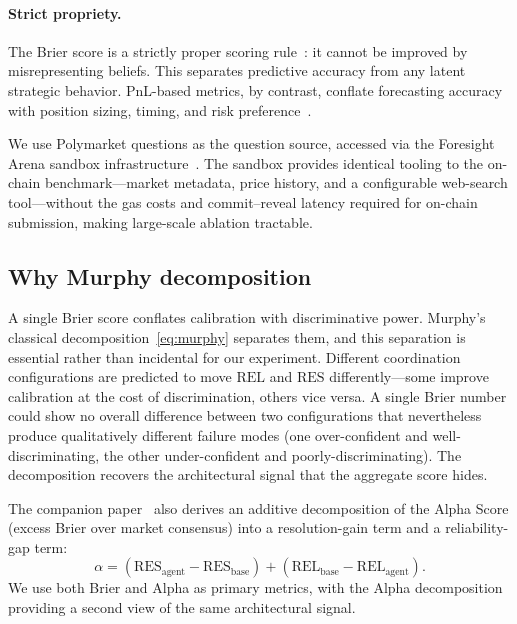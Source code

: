 \documentclass[11pt]{article}
\newcommand{\REL}{\mathrm{REL}}
\newcommand{\RES}{\mathrm{RES}}
\begin{document}
\paragraph{Strict propriety.}
The Brier score is a strictly proper scoring rule~\citep{brier1950verification,gneiting2007strictly}: it cannot be improved by misrepresenting beliefs. This separates predictive accuracy from any latent strategic behavior. PnL-based metrics, by contrast, conflate forecasting accuracy with position sizing, timing, and risk preference~\citep{nechepurenko2026foresight,zhang2026predictionarena}.

We use Polymarket questions as the question source, accessed via the Foresight Arena sandbox infrastructure~\citep{nechepurenko2026foresight}. The sandbox provides identical tooling to the on-chain benchmark---market metadata, price history, and a configurable web-search tool---without the gas costs and commit--reveal latency required for on-chain submission, making large-scale ablation tractable.

\subsection{Why Murphy decomposition}
\label{sec:method-murphy}

A single Brier score conflates calibration with discriminative power. Murphy's classical decomposition~\eqref{eq:murphy} separates them, and this separation is essential rather than incidental for our experiment. Different coordination configurations are predicted to move $\REL$ and $\RES$ differently---some improve calibration at the cost of discrimination, others vice versa. A single Brier number could show no overall difference between two configurations that nevertheless produce qualitatively different failure modes (one over-confident and well-discriminating, the other under-confident and poorly-discriminating). The decomposition recovers the architectural signal that the aggregate score hides.

The companion paper~\citep{nechepurenko2026foresight} also derives an additive decomposition of the Alpha Score (excess Brier over market consensus) into a resolution-gain term and a reliability-gap term:
\begin{equation*}
\alpha = (\RES_{\mathrm{agent}} - \RES_{\mathrm{base}}) + (\REL_{\mathrm{base}} - \REL_{\mathrm{agent}}).
\end{equation*}
We use both Brier and Alpha as primary metrics, with the Alpha decomposition providing a second view of the same architectural signal.
\end{document}
